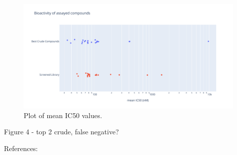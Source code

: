 \begin{figure}
    \centering
             \includegraphics[width=\textwidth]{Chapters/Crude/Figs/strip_plot.pdf}
        \caption{Plot of mean IC50 values.}
        \label{fig:strip}
    \end{figure}

Figure 4 - top 2 crude, false negative?

References:

